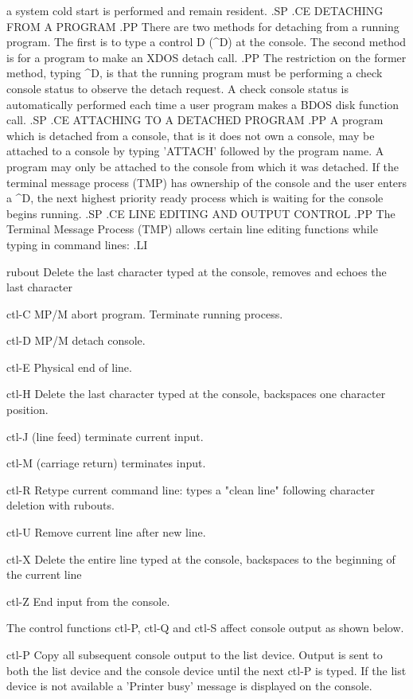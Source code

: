 a system cold start is performed and remain resident.
.SP
.CE
DETACHING FROM A PROGRAM
.PP
There are two methods for detaching from a running program.  The first
is to type a control D (^D) at the console.  The second method is for
a program to make an XDOS detach call.
.PP
The restriction on the former method, typing ^D, is that the running
program must be performing a check console status to observe the
detach request.
A check console status is automatically performed each time
a user program makes a BDOS disk function call.
.SP
.CE
ATTACHING TO A DETACHED PROGRAM
.PP
A program which is detached from a console, that is it does not own a
console, may be attached to a console by typing 'ATTACH' followed by
the program name.  A program may only be attached to the console from
which it was detached.
If the terminal message process (TMP)
has ownership of the console and the user enters a ^D, the
next highest priority ready process which is waiting for the console
begins running.
.SP
.CE
LINE EDITING AND OUTPUT CONTROL
.PP
The Terminal Message Process (TMP) allows certain line editing
functions while typing in command lines:
.LI

	rubout	Delete the last character typed at the console,
	        removes and echoes the last character

	ctl-C	MP/M abort program. Terminate running process.

	ctl-D   MP/M detach console.

	ctl-E   Physical end of line.

	ctl-H   Delete the last character typed at the console,
	        backspaces one character position.

	ctl-J   (line feed) terminate current input.

	ctl-M   (carriage return) terminates input.

	ctl-R	Retype current command line: types a "clean line"
		following character deletion with rubouts.

	ctl-U   Remove current line after new line.

	ctl-X	Delete the entire line typed at the console,
	        backspaces to the beginning of the current line

	ctl-Z	End input from the console.

   The control functions ctl-P, ctl-Q and ctl-S affect console
   output as shown below.

	ctl-P	Copy all subsequent console output to the list
		device.  Output is sent to both the list device
		and the console device until the next ctl-P
		is typed.  If the list device is not available
		a 'Printer busy' message is displayed on the
		console.

